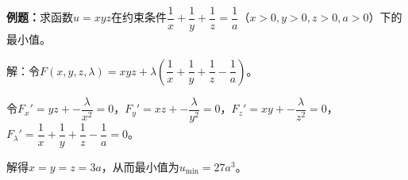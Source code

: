 \documentclass[UTF8, 12pt]{ctexart}
\begin{document}
\textbf{例题：}求函数$u=xyz$在约束条件$\dfrac{1}{x}+\dfrac{1}{y}+\dfrac{1}{z}=\dfrac{1}{a}$（$x>0,y>0,z>0,a>0$）下的最小值。

解：令$F(x,y,z,\lambda)=xyz+\lambda\left(\dfrac{1}{x}+\dfrac{1}{y}+\dfrac{1}{z}-\dfrac{1}{a}\right)$。

令$F_x'=yz+-\dfrac{\lambda}{x^2}=0$，$F_y'=xz+-\dfrac{\lambda}{y^2}=0$，$F_z'=xy+-\dfrac{\lambda}{z^2}=0$，$F_\lambda'=\dfrac{1}{x}+\dfrac{1}{y}+\dfrac{1}{z}-\dfrac{1}{a}=0$。

解得$x=y=z=3a$，从而最小值为$u_{\min}=27a^3$。


\end{document}
